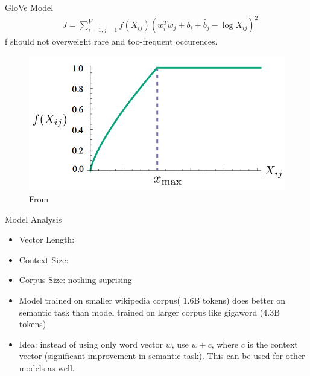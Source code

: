 \begin{frame}{GloVe Model}
  \begin{align*}
    & J = \sum_{i=1,j=1}^V f(X_{ij}) \left( w_i^T\tilde{w_j} +b_i + \tilde{b_j} - \log X_{ij} \right)^2
  \end{align*}
  f should not overweight rare and too-frequent occurences.
  \begin{figure}
    \includegraphics[scale=0.27]{images/weighting.png}
    \caption{From}
  \end{figure}
\end{frame}


\begin{frame}{Model Analysis}
  \begin{itemize}
  \item Vector Length:
  \item Context Size: 
  \item Corpus Size: nothing suprising
  \item Model trained on smaller wikipedia corpus( 1.6B tokens) does better on semantic task than model trained on larger corpus like gigaword (4.3B tokens)
  \item Idea: instead of using only word vector $w$, use $w+c$, where $c$ is the context vector (significant improvement in semantic task). This can be used for other models as well.
  \end{itemize}
\end{frame}

